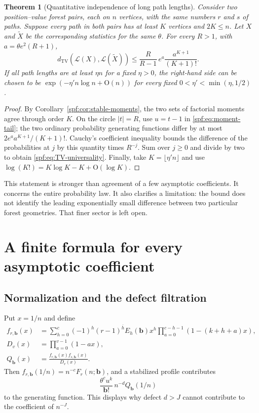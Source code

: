 \documentclass[11pt]{article}
\numberwithin{equation}{section}
\newtheorem{theorem}{Theorem}[section]
\theoremstyle{definition}
\theoremstyle{remark}
\theoremstyle{definition}
\newcommand{\rise}[2]{{#1}^{\overline{#2}}}
\newcommand{\bfac}{\mathbf b!}
\newcommand{\TV}{d_{\mathrm{TV}}}
\newcommand{\bigO}{\mathrm O}
\begin{document}
\begin{theorem}[Quantitative independence of long path lengths]
\label{spf:thm:universality}
Consider two position--value forest pairs, each on $n$ vertices, with the same
numbers $r$ and $s$ of paths. Suppose every path in both pairs has at least $K$
vertices and $2K\le n$. Let $X$ and $\widetilde X$ be the corresponding
statistics for the same $\theta$. For every $R>1$, with
$a=\theta e^2(R+1)$,
\begin{equation}
 \TV(\mathcal L(X),\mathcal L(\widetilde X))
 \le \frac{R}{R-1}\,e^a\frac{a^{K+1}}{(K+1)!}.
 \label{spf:eq:TV-universality}
\end{equation}
If all path lengths are at least $\eta n$ for a fixed $\eta>0$, the right-hand
side can be chosen to be
$\exp(-\eta' n\log n+\bigO(n))$ for every fixed
$0<\eta'<\min(\eta,1/2)$.
\end{theorem}
\begin{proof}
By Corollary~\ref{spf:cor:stable-moments}, the two sets of factorial moments agree through
order $K$. On the circle $|t|=R$, use $u=t-1$ in
\eqref{spf:eq:moment-tail}; the two ordinary probability generating functions differ
by at most $2e^a a^{K+1}/(K+1)!$. Cauchy's coefficient inequality bounds the
difference of the probabilities at $j$ by this quantity times $R^{-j}$.
Sum over $j\ge0$ and divide by two to obtain \eqref{spf:eq:TV-universality}.
Finally, take $K=\lfloor\eta'n\rfloor$ and use
$\log(K!)=K\log K-K+\bigO(\log K)$.
\end{proof}

This statement is stronger than agreement of a few asymptotic coefficients.
It concerns the entire probability law. It also clarifies a limitation: the
bound does not identify the leading exponentially small difference between
two particular forest geometries. That finer sector is left open.

\section{A finite formula for every asymptotic coefficient}
\label{spf:sec:coefficients}

\subsection{Normalization and the defect filtration}

Put $x=1/n$ and define
\begin{align}
 f_{r,\mathbf b}(x)
 &=\sum_{h=0}^{c}(-1)^h\rise{(r-1)}h E_h(\mathbf b)x^h
       \prod_{a=0}^{c-h-1}(1-(k+h+a)x),\\
 D_v(x)&=\prod_{a=0}^{v-1}(1-ax),\\
 Q_{\mathbf b}(x)&=\frac{f_{r,\mathbf b}(x)f_{s,\mathbf b}(x)}{D_v(x)}.
 \label{spf:eq:Q}
\end{align}
Then $f_{r,\mathbf b}(1/n)=n^{-c}F_r(n;\mathbf b)$, and a stabilized profile
contributes
\begin{equation}
 \frac{\theta^c u^k}{\bfac}\,n^{-d}Q_{\mathbf b}(1/n)
 \label{spf:eq:normalized-profile}
\end{equation}
to the generating function. This displays why defect $d>J$ cannot contribute
to the coefficient of $n^{-J}$.
\end{document}

